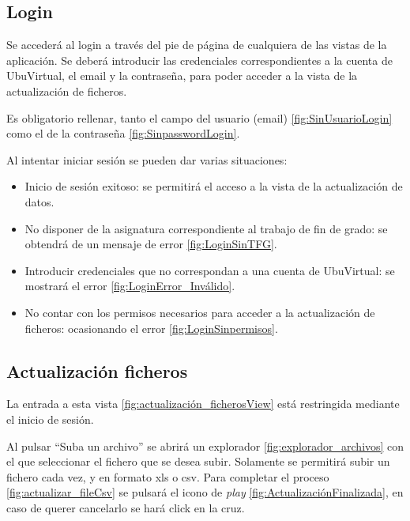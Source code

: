 \subsection{Login} 
Se accederá al login a través del pie de página de cualquiera de las vistas de la aplicación. Se deberá introducir las credenciales correspondientes a la cuenta de UbuVirtual, el email y la contraseña, para poder acceder a la vista de la actualización de ficheros.

Es obligatorio rellenar, tanto el campo del usuario (email) \ref{fig:SinUsuarioLogin} como el de la contraseña \ref{fig:SinpasswordLogin}.

Al intentar iniciar sesión se pueden dar varias situaciones:
\begin{itemize}
	\item Inicio de sesión exitoso: se permitirá el acceso a la vista de la actualización de datos.	
	\item No disponer de la asignatura correspondiente al trabajo de fin de grado: se obtendrá de un mensaje de error \ref{fig:LoginSinTFG}.  	
	\item Introducir credenciales que no correspondan a una cuenta de UbuVirtual: se mostrará el error \ref{fig:LoginError_Inválido}.	
	\item No contar con los permisos necesarios para acceder a la actualización de ficheros: ocasionando el error \ref{fig:LoginSinpermisos}.
\end{itemize}

\subsection{Actualización ficheros} 
La entrada a esta vista \ref{fig:actualización_ficherosView} está restringida mediante el inicio de sesión.    


Al pulsar ``Suba un archivo'' se abrirá un explorador \ref{fig:explorador_archivos} con el que seleccionar el fichero que se desea subir. Solamente se permitirá subir un fichero cada vez, y en formato xls o csv. Para completar el proceso \ref{fig:actualizar_fileCsv} se pulsará el icono de \emph{play} \ref{fig:ActualizaciónFinalizada}, en caso de querer cancelarlo se hará click en la cruz.

